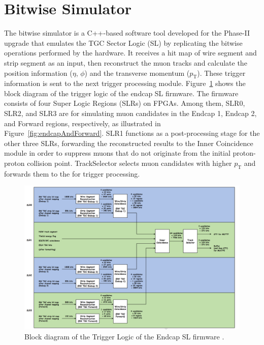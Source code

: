 \section{Bitwise Simulator} \label{sec:BitwiseSimulator}
The bitwise simulator is a C++-based software tool developed for the Phase-II upgrade that emulates the TGC Sector Logic (SL) by replicating the bitwise operations performed by the hardware. It receives a hit map of wire segment and strip segment as an input, then reconstruct the muon tracks and calculate the position information ($\eta$, $\phi$) and the transverse momentum ($p_\mathrm{T}$). These trigger information is sent to the next trigger processing module. Figure~\ref{fig:blockDiagram} shows the block diagram of the trigger logic of the endcap SL firmware. The firmware consists of four Super Logic Regions (SLRs) on FPGAs. Among them, SLR0, SLR2, and SLR3 are for simulating muon candidates in the Endcap 1, Endcap 2, and Forward regions, respectively, as illustrated in Figure~\ref{fig:endcapAndForward}. SLR1 functions as a post-processing stage for the other three SLRs, forwarding the reconstructed results to the Inner Coincidence module in order to suppress muons that do not originate from the initial proton-proton collision point.
TrackSelector selects muon candidates with higher $p_\mathrm{T}$ and forwards them to the \MUCTPI for trigger processing.
\begin{figure}
  \centering
  \includegraphics[width=1.0\textwidth]{figs/chapter5/block_diagram_of_trigger_logic.png}
  \caption{Block diagram of the Trigger Logic of the Endcap SL firmware \cite{EndcapSLPDR}.}
  \label{fig:blockDiagram}
\end{figure}

